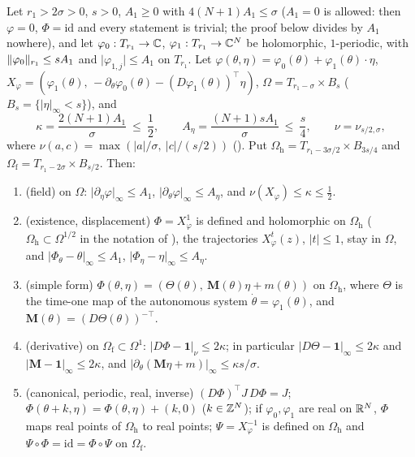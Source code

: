 \begin{lemma}\label{bpP:p11a:affine-flow}
Let $r_1>2\sigma>0$, $s>0$, $A_1\ge0$ with $4(N+1)A_1\le\sigma$ ($A_1=0$ is allowed: then $\varphi=0$, $\Phi=\mathrm{id}$ and every statement is trivial; the proof below divides by $A_1$ nowhere), and let $\varphi_0:T_{r_1}\to\mathbb{C}$, $\varphi_1:T_{r_1}\to\mathbb{C}^N$ be holomorphic, $1$-periodic, with $\lVert \varphi_0\rVert_{r_1}\le sA_1$ and $\lvert\varphi_{1,j}\rvert\le A_1$ on $T_{r_1}$. Let $\varphi(\theta,\eta)=\varphi_0(\theta)+\varphi_1(\theta)\cdot\eta$, $X_\varphi=(\varphi_1(\theta),\,-\partial_\theta\varphi_0(\theta)-(D\varphi_1(\theta))^{\top}\eta)$, $\Omega=T_{r_1-\sigma}\times B_s$ ($B_s=\{\lvert\eta\rvert_\infty<s\}$), and
\[\kappa=\frac{2(N+1)A_1}{\sigma}\ \le\ \frac12,\qquad A_\eta=\frac{(N+1)sA_1}{\sigma}\ \le\ \frac s4,\qquad \nu=\nu_{s/2,\sigma},\]
where $\nu(a,c)=\max(\lvert a\rvert/\sigma,\ \lvert c\rvert/(s/2))$ (). Put $\Omega_{\mathrm h}=T_{r_1-3\sigma/2}\times B_{3s/4}$ and $\Omega_{\mathrm f}=T_{r_1-2\sigma}\times B_{s/2}$. Then:
\begin{enumerate}[label=(\alph*)]
\item (field) on $\Omega$: $\lvert\partial_\eta\varphi\rvert_\infty\le A_1$, $\lvert\partial_\theta\varphi\rvert_\infty\le A_\eta$, and $\nu(X_\varphi)\le\kappa\le\frac12$.
\item (existence, displacement) $\Phi=X^1_\varphi$ is defined and holomorphic on $\Omega_{\mathrm h}$ ($\Omega_{\mathrm h}\subset\Omega^{1/2}$ in the notation of ), the trajectories $X^t_\varphi(z)$, $\lvert t\rvert\le1$, stay in $\Omega$, and $\lvert\Phi_\theta-\theta\rvert_\infty\le A_1$, $\lvert\Phi_\eta-\eta\rvert_\infty\le A_\eta$.
\item (simple form) $\Phi(\theta,\eta)=(\Theta(\theta),\ \mathbf M(\theta)\eta+m(\theta))$ on $\Omega_{\mathrm h}$, where $\Theta$ is the time-one map of the autonomous system $\dot\theta=\varphi_1(\theta)$, and $\mathbf M(\theta)=(D\Theta(\theta))^{-\top}$.
\item (derivative) on $\Omega_{\mathrm f}\subset\Omega^1$: $\lvert D\Phi-\mathbf 1\rvert_\nu\le2\kappa$; in particular $\lvert D\Theta-\mathbf 1\rvert_\infty\le2\kappa$ and $\lvert\mathbf M-\mathbf 1\rvert_\infty\le2\kappa$, and $\lvert\partial_\theta(\mathbf M\eta+m)\rvert_\infty\le\kappa s/\sigma$.
\item (canonical, periodic, real, inverse) $(D\Phi)^\top J\,D\Phi=J$; $\Phi(\theta+k,\eta)=\Phi(\theta,\eta)+(k,0)$ ($k\in\mathbb{Z}^N$); if $\varphi_0,\varphi_1$ are real on $\mathbb{R}^N$, $\Phi$ maps real points of $\Omega_{\mathrm h}$ to real points; $\Psi=X^{-1}_\varphi$ is defined on $\Omega_{\mathrm h}$ and $\Psi\circ\Phi=\mathrm{id}=\Phi\circ\Psi$ on $\Omega_{\mathrm f}$.

\end{enumerate}
\end{lemma}
